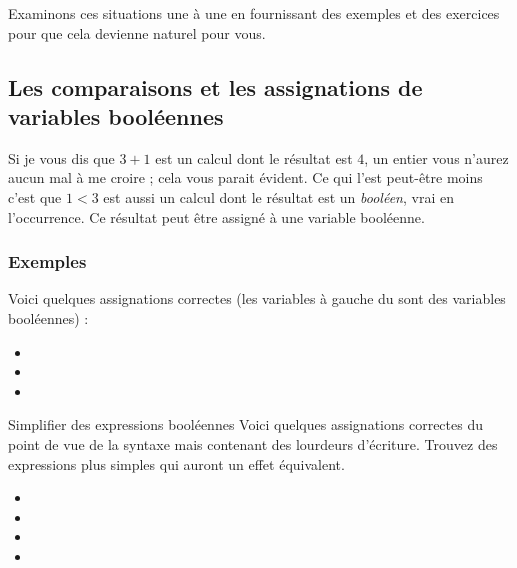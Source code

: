 		Examinons ces situations une à une
		en fournissant des exemples et des exercices
		pour que cela devienne naturel pour vous.
		
		\subsection{Les comparaisons et les assignations de variables booléennes}
		
			Si je vous dis que $3+1$ est un calcul
			dont le résultat est $4$, un entier
			vous n'aurez aucun mal à me croire ; 
			cela vous parait évident.
			Ce qui l'est peut-être moins c'est que $1<3$ est aussi
			un calcul dont le résultat est un \emph{booléen},
			vrai en l’occurrence. 
			Ce résultat peut être assigné à une variable booléenne.
			
			\subsubsection{Exemples}
			Voici quelques assignations correctes 
			(les variables à gauche du \Gets sont des variables booléennes) :
			\begin{itemize}
				\item {} 
				\item {}
				\item {}
			\end{itemize}
	
			\begin{Exercice}{Simplifier des expressions booléennes}
				Voici quelques assignations correctes du point de vue de la
				syntaxe mais contenant des lourdeurs d’écriture.
				Trouvez des expressions plus simples
				qui auront un effet équivalent.
				\begin{itemize}
					\item {}
					\item {}
					\item {}
					\item {}
				\end{itemize}		
			\end{Exercice}
			
